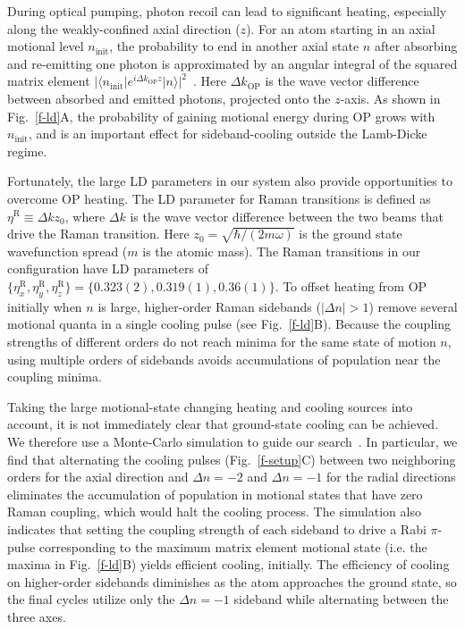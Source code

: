 \documentclass[aps,prl,twocolumn,groupedaddress]{revtex4-1}
\begin{document}
During optical pumping, photon recoil can lead to significant heating,
especially along the weakly-confined axial direction ($z$).
For an atom starting in an axial motional level $n_{\textrm{init}}$,
the probability to end in another axial state $n$ after absorbing and
re-emitting one photon is approximated by an angular integral of the squared matrix element
$|\langle n_{\textrm{init}}|e^{i \Delta k_{\textrm{OP}} z}| n\rangle|^2$~\cite{ItanoWineland1979}.
Here $\Delta k_{\textrm{OP}}$ is the wave vector difference between absorbed and emitted photons,
projected onto the $z$-axis.
As shown in Fig.~\ref{f-ld}A,
the probability of gaining motional energy during OP grows with $n_{\textrm{init}}$,
and is an important effect for sideband-cooling outside the Lamb-Dicke regime.

Fortunately, the large LD parameters in our system also provide opportunities to overcome OP heating.
The LD parameter for Raman transitions is defined as $\eta^{\textrm{R}}\equiv\Delta k z_0$,
where $\Delta k$ is the wave vector difference
between the two beams that drive the Raman transition.
Here $z_0=\sqrt{\hbar/(2 m \omega)}$ is the ground state wavefunction spread
($m$ is the atomic mass).
The Raman transitions in our configuration have LD parameters of
$\{\eta^{\textrm{R}}_x,\eta^{\textrm{R}}_y,\eta^{\textrm{R}}_z\} = \{0.323(2), 0.319(1), 0.36(1)\}$.
To offset heating from OP initially when $n$ is large, higher-order Raman sidebands
($|\Delta n| > 1$) remove several motional quanta in a single cooling pulse (see Fig.~\ref{f-ld}B).
Because the coupling strengths of different orders do not reach minima
for the same state of motion $n$,
using multiple orders of sidebands avoids accumulations of population
near the coupling minima.

Taking the large motional-state changing heating and cooling sources into account,
it is not immediately clear that ground-state cooling can be achieved.
We therefore use a Monte-Carlo simulation to guide our search~\cite{Dalibard1992}.
In particular, we find that alternating the cooling pulses (Fig.~\ref{f-setup}C) between two
neighboring orders for the axial direction and $\Delta n=-2$ and $\Delta n=-1$
for the radial directions
eliminates the accumulation of population in motional states that have zero Raman coupling,
which would halt the cooling process.
The simulation also indicates that setting the coupling strength of each sideband
to drive a Rabi $\pi$-pulse corresponding to the maximum matrix element motional state
(i.e. the maxima in Fig.~\ref{f-ld}B)  yields efficient cooling, initially.
The efficiency of cooling on higher-order sidebands diminishes
as the atom approaches the ground state, so the final cycles utilize only
the $\Delta n=-1$ sideband while alternating between the three axes.
\end{document}
